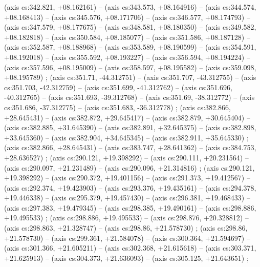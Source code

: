     (axis cs:342.821,    +08.162161) --  (axis cs:343.573,    +08.164916) --  (axis cs:344.574,    +08.168413) --  (axis cs:345.576,    +08.171706) --  (axis cs:346.577,    +08.174793) --  (axis cs:347.579,    +08.177675) --  (axis cs:348.581,    +08.180350) --  (axis cs:349.582,    +08.182818) --  (axis cs:350.584,    +08.185077) --  (axis cs:351.586,    +08.187128) --  (axis cs:352.587,    +08.188968) --  (axis cs:353.589,    +08.190599) --  (axis cs:354.591,    +08.192018) --  (axis cs:355.592,    +08.193227) --  (axis cs:356.594,    +08.194224) --  (axis cs:357.596,    +08.195009) --  (axis cs:358.597,    +08.195582) --  (axis cs:359.098,    +08.195789) ;
    (axis cs:351.71,    -44.312751) --  (axis cs:351.707,    -43.312755) --  (axis cs:351.703,    -42.312759) --  (axis cs:351.699,    -41.312762) --  (axis cs:351.696,    -40.312765) --  (axis cs:351.693,    -39.312768) --  (axis cs:351.69,    -38.312772) --  (axis cs:351.686,    -37.312775) --  (axis cs:351.683,    -36.312778) ;
    (axis cs:382.866,    +28.645431) --  (axis cs:382.872,    +29.645417) --  (axis cs:382.879,    +30.645404) --  (axis cs:382.885,    +31.645390) --  (axis cs:382.891,    +32.645375) --  (axis cs:382.898,    +33.645360) --  (axis cs:382.904,    +34.645345) --  (axis cs:382.911,    +35.645330) ;
    (axis cs:382.866,    +28.645431) --  (axis cs:383.747,    +28.641362) --  (axis cs:384.753,    +28.636527) ;
    (axis cs:290.121,    +19.398292) --  (axis cs:290.111,    +20.231564) --  (axis cs:290.097,    +21.231489) --  (axis cs:290.096,    +21.314816) ;
    (axis cs:290.121,    +19.398292) --  (axis cs:290.372,    +19.401156) --  (axis cs:291.373,    +19.412567) --  (axis cs:292.374,    +19.423903) --  (axis cs:293.376,    +19.435161) --  (axis cs:294.378,    +19.446338) --  (axis cs:295.379,    +19.457430) --  (axis cs:296.381,    +19.468433) --  (axis cs:297.383,    +19.479345) --  (axis cs:298.385,    +19.490161) --  (axis cs:298.886,    +19.495533) ;
    (axis cs:298.886,    +19.495533) --  (axis cs:298.876,    +20.328812) --  (axis cs:298.863,    +21.328747) --  (axis cs:298.86,    +21.578730) ;
    (axis cs:298.86,    +21.578730) --  (axis cs:299.361,    +21.584078) --  (axis cs:300.364,    +21.594697) --  (axis cs:301.366,    +21.605211) --  (axis cs:302.368,    +21.615618) --  (axis cs:303.371,    +21.625913) --  (axis cs:304.373,    +21.636093) --  (axis cs:305.125,    +21.643651) ;
